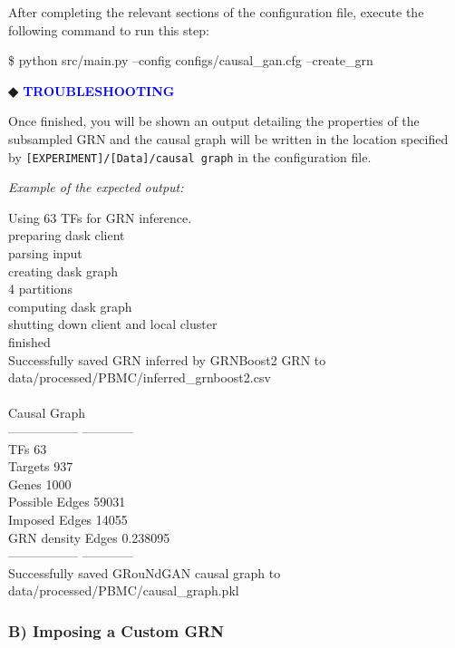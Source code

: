 \begin{tcolorbox}
After completing the relevant sections of the configuration file, execute the following command
to run this step:
\begin{codeblock}
\$ python src/main.py --config configs/causal\_gan.cfg --create\_grn
\end{codeblock}
\textbf{◆ \textcolor{blue}{TROUBLESHOOTING}}

Once finished, you will be shown an output detailing the properties of the subsampled GRN and
the causal graph will be written in the location specified by \texttt{[EXPERIMENT]/[Data]/causal
graph} in the configuration file.

\textit{Example of the expected output:}
\begin{codeblock}
Using 63 TFs for GRN inference.\\
preparing dask client\\
parsing input\\
creating dask graph\\
4 partitions\\
computing dask graph\\
shutting down client and local cluster\\
finished\\
Successfully saved GRN inferred by GRNBoost2 GRN to data/processed/PBMC/inferred\_grnboost2.csv\\
\\
Causal Graph\\
----------------- ------------\\
TFs 63\\
Targets 937\\
Genes 1000\\
Possible Edges 59031\\
Imposed Edges 14055\\
GRN density Edges 0.238095\\
----------------- ------------\\
Successfully saved GRouNdGAN causal graph to data/processed/PBMC/causal\_graph.pkl
\end{codeblock}

\subsubsection*{B) Imposing a Custom GRN}




\end{tcolorbox}
